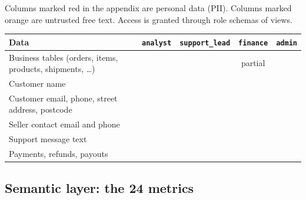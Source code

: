 \documentclass[11pt,a4paper]{article}
\newcommand{\code}[1]{\texttt{\small #1}}
\newcommand{\tick}{\textcolor{good}{\checkmark}}
\begin{document}
Columns marked \textcolor{bad}{red} in the appendix are personal data (PII). Columns marked
\textcolor{warn}{orange} are untrusted free text. Access is granted through role schemas of views.

\begin{center}
\small
\begin{tabular}{@{}l c c c c@{}}
\toprule
\textbf{Data} & \code{analyst} & \code{support\_lead} & \code{finance} & \code{admin}\\
\midrule
Business tables (orders, items, products, shipments, \ldots) & \tick & \tick & partial & \tick\\
Customer name & & \tick & & \tick\\
Customer email, phone, street address, postcode & & & & \tick\\
Seller contact email and phone & & & & \tick\\
Support message text & & \tick & & \tick\\
Payments, refunds, payouts & \tick & \tick & \tick & \tick\\
\bottomrule
\end{tabular}
\end{center}

\subsection{Semantic layer: the 24 metrics}
\end{document}
